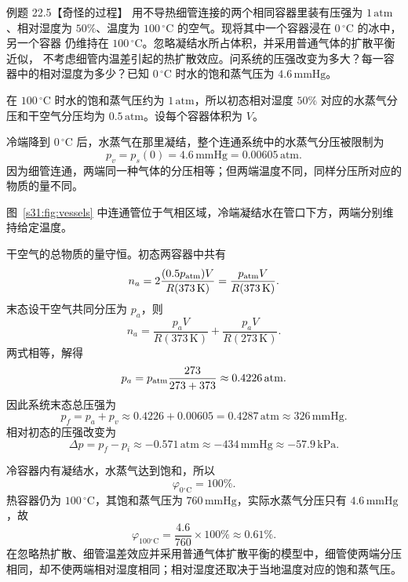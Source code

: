 \par\medskip
\begin{origexamplebox}{例题 22.5【奇怪的过程】}
用不导热细管连接的两个相同容器里装有压强为 $1\,\mathrm{atm}$、相对湿度为 $50\%$、温度为
$100\,{}^{\circ}\mathrm C$ 的空气。现将其中一个容器浸在 $0\,{}^{\circ}\mathrm C$ 的冰中，另一个容器
仍维持在 $100\,{}^{\circ}\mathrm C$。忽略凝结水所占体积，并采用普通气体的扩散平衡近似，
不考虑细管内温差引起的热扩散效应。问系统的压强改变为多大？每一容器中的相对湿度为多少？已知
$0\,{}^{\circ}\mathrm C$ 时水的饱和蒸气压为 $4.6\,\mathrm{mmHg}$。
\end{origexamplebox}

\begin{xesolution}
在 $100\,{}^{\circ}\mathrm C$ 时水的饱和蒸气压约为 $1\,\mathrm{atm}$，所以初态相对湿度 $50\%$
对应的水蒸气分压和干空气分压均为 $0.5\,\mathrm{atm}$。设每个容器体积为 $V$。

冷端降到 $0\,{}^{\circ}\mathrm C$ 后，水蒸气在那里凝结，整个连通系统中的水蒸气分压被限制为
\[
  p_v=p_s(0)=4.6\,\mathrm{mmHg}=0.00605\,\mathrm{atm}.
\]
因为细管连通，两端同一种气体的分压相等；但两端温度不同，同样分压所对应的物质的量不同。

\twoVesselsFigure
{}\label{s31:fig:vessels}
图~\ref{s31:fig:vessels} 中连通管位于气相区域，冷端凝结水在管口下方，两端分别维持给定温度。

干空气的总物质的量守恒。初态两容器中共有
\[
  n_a=2\frac{(0.5p_{\rm atm})V}{R(373\,\mathrm K)}
  =\frac{p_{\rm atm}V}{R(373\,\mathrm K)}.
\]
末态设干空气共同分压为 $p_a$，则
\[
  n_a=\frac{p_aV}{R(373\,\mathrm K)}
      +\frac{p_aV}{R(273\,\mathrm K)}.
\]
两式相等，解得
\[
  p_a=p_{\rm atm}\frac{273}{273+373}
  \approx0.4226\,\mathrm{atm}.
\]
因此系统末态总压强为
\[
  p_f=p_a+p_v\approx0.4226+0.00605=0.4287\,\mathrm{atm}
  \approx326\,\mathrm{mmHg}.
\]
相对初态的压强改变为
\[
  \boxed{\Delta p=p_f-p_i\approx-0.571\,\mathrm{atm}
  \approx-434\,\mathrm{mmHg}\approx-57.9\,\mathrm{kPa}}.
\]

冷容器内有凝结水，水蒸气达到饱和，所以
\[
  \boxed{\varphi_{0{}^\circ\mathrm C}=100\%}.
\]
热容器仍为 $100\,{}^{\circ}\mathrm C$，其饱和蒸气压为 $760\,\mathrm{mmHg}$，实际水蒸气分压只有
$4.6\,\mathrm{mmHg}$，故
\[
  \boxed{\varphi_{100{}^\circ\mathrm C}
  =\frac{4.6}{760}\times100\%\approx0.61\%}.
\]
在忽略热扩散、细管温差效应并采用普通气体扩散平衡的模型中，细管使两端分压相同，却不使两端相对湿度相同；相对湿度还取决于当地温度对应的饱和蒸气压。
\end{xesolution}

